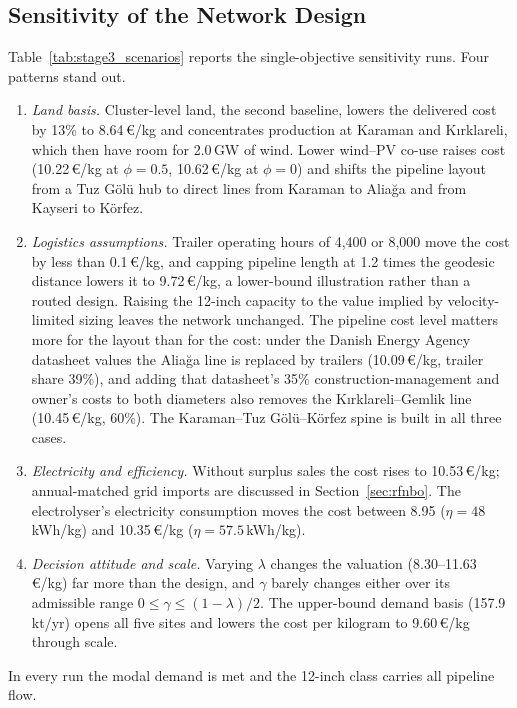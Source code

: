 \documentclass[preprint,12pt,authoryear]{elsarticle}
\begin{document}
\subsection{Sensitivity of the Network Design}
\label{sec:stage3_sens}
Table~\ref{tab:stage3_scenarios} reports the single-objective sensitivity runs. Four patterns stand out.
\begin{enumerate}
    \item \textit{Land basis.} Cluster-level land, the second baseline, lowers the delivered cost by 13\% to 8.64\,€/kg and concentrates production at Karaman and Kırklareli, which then have room for 2.0\,GW of wind. Lower wind--PV co-use raises cost (10.22\,€/kg at $\phi=0.5$, 10.62\,€/kg at $\phi=0$) and shifts the pipeline layout from a Tuz Gölü hub to direct lines from Karaman to Aliağa and from Kayseri to Körfez.
    \item \textit{Logistics assumptions.} Trailer operating hours of 4,400 or 8,000 move the cost by less than 0.1\,€/kg, and capping pipeline length at 1.2 times the geodesic distance lowers it to 9.72\,€/kg, a lower-bound illustration rather than a routed design. Raising the 12-inch capacity to the value implied by velocity-limited sizing \citep{dea2025hydrogen} leaves the network unchanged. The pipeline cost level matters more for the layout than for the cost: under the Danish Energy Agency datasheet values \citep{dea2025datasheet} the Aliağa line is replaced by trailers (10.09\,€/kg, trailer share 39\%), and adding that datasheet's 35\% construction-management and owner's costs to both diameters also removes the Kırklareli--Gemlik line (10.45\,€/kg, 60\%). The Karaman--Tuz Gölü--Körfez spine is built in all three cases.
    \item \textit{Electricity and efficiency.} Without surplus sales the cost rises to 10.53\,€/kg; annual-matched grid imports are discussed in Section~\ref{sec:rfnbo}. The electrolyser's electricity consumption moves the cost between 8.95 ($\eta=48$\,kWh/kg) and 10.35\,€/kg ($\eta=57.5$\,kWh/kg).
    \item \textit{Decision attitude and scale.} Varying $\lambda$ changes the valuation (8.30--11.63\,€/kg) far more than the design, and $\gamma$ barely changes either over its admissible range $0\le\gamma\le(1-\lambda)/2$. The upper-bound demand basis (157.9\,kt/yr) opens all five sites and lowers the cost per kilogram to 9.60\,€/kg through scale.
\end{enumerate}
In every run the modal demand is met and the 12-inch class carries all pipeline flow.
\end{document}
